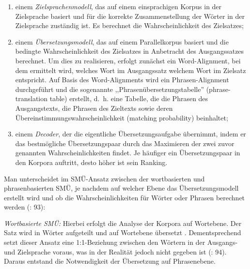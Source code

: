 \begin{enumerate}[label = {(\arabic*)}, align = left]%

\item
         einem \textit{Zielsprachenmodell}, das auf einem einsprachigen Korpus in der Zielsprache basiert und für die korrekte Zusammenstellung der Wörter in der Zielsprache zuständig ist. Es berechnet die Wahrscheinlichkeit des Zielsatzes;


\item

         einem \textit{Übersetzungsmodell}, das auf einem Parallelkorpus basiert und die bedingte Wahrscheinlichkeit des Zielsatzes in Anbetracht des Ausgangssatzes berechnet. Um dies zu realisieren, erfolgt zunächst ein Word-Alignment, bei dem ermittelt wird, welches Wort im Ausgangssatz welchem Wort im Zielsatz entspricht. Auf Basis des Word-Alignments wird ein Phrasen-A\-lign\-ment durchgeführt und die sogenannte ,,Phrasenübersetzungstabelle'' (phrase-translation table) erstellt, d.~h. eine Tabelle, die die Phrasen des Ausgangstexts, die Phrasen des Zieltexts sowie deren Übereinstimmungswahrscheinlichkeit (matching probability) beinhaltet;

\item
         einem \textit{Decoder}, der die eigentliche Übersetzungsaufgabe übernimmt, indem er das bestmögliche Übersetzungspaar durch das Maximieren der zwei zuvor genannten Wahrscheinlichkeiten findet. Je häufiger ein Übersetzungspaar in den Korpora auftritt, desto höher ist sein Ranking.
\end{enumerate}

Man unterscheidet im SMÜ-Ansatz zwischen der wortbasierten und phrasenbasierten SMÜ, je nachdem auf welcher Ebene das Übersetzungsmodell erstellt wird und ob die Wahrscheinlichkeiten für Wörter oder Phrasen berechnet werden (\citealt{WerthmannWitt2014}: 93):

\textit{Wortbasierte SMÜ:} Hierbei erfolgt die Analyse der Korpora auf Wortebene. Der Satz wird in Wörter aufgeteilt und auf Wortebene übersetzt \citep[81]{Köhn2010}. Dementsprechend setzt dieser Ansatz eine 1:1-Beziehung zwischen den Wörtern in der Ausgangs- und Zielsprache voraus, was in der Realität jedoch nicht gegeben ist (\citealt{WerthmannWitt2014}: 94). Daraus entstand die Notwendigkeit der Übersetzung auf Phrasenebene.


